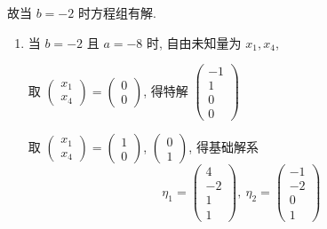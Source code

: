 		 故当 \( b = -2 \) 时方程组有解.
		 \begin{enumerate}
			 \item %
			       当 \( b = -2 \) 且 \( a = -8 \) 时, 自由未知量为 \( x_{1}, x_{4} \),

			       取 \( \begin{pmatrix}
				       x_{1} \\
				       x_{4}
			       \end{pmatrix} = \begin{pmatrix}
				       0 \\
				       0
			       \end{pmatrix} \), 得特解 \( \begin{pmatrix}
				       -1 \\
				       1  \\
				       0  \\
				       0
			       \end{pmatrix} \)

			       取 \( \begin{pmatrix}
				       x_{1} \\
				       x_{4}
			       \end{pmatrix} = \begin{pmatrix}
				       1 \\
				       0
			       \end{pmatrix} \), \( \begin{pmatrix}
				       0 \\
				       1
			       \end{pmatrix} \), 得基础解系
			       \[ \eta_{1} = \begin{pmatrix}
					       4  \\
					       -2 \\
					       1  \\
					       1
				       \end{pmatrix}, \  \eta_{2} = \begin{pmatrix}
					       -1 \\
					       -2 \\
					       0  \\
					       1
				       \end{pmatrix} \]


\end{enumerate}
